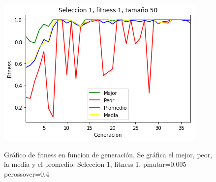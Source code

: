 \documentclass[A4paper,oneside,fleqn,11pt]{article}
\theoremstyle{definition}
\begin{document}
\begin{figure}[H]
	\captionsetup[subfigure]{position=b}
	\centering
		{\includegraphics[width=0.3\linewidth]{s1f1t50.png}}
	\caption{Gráfico de fitness en funcion de generación. Se gráfica el mejor, peor, la media y el promedio. Seleccion 1, fitness 1, pmutar=0.005 pcrossover=0.4}
\end{figure}
\end{document}
